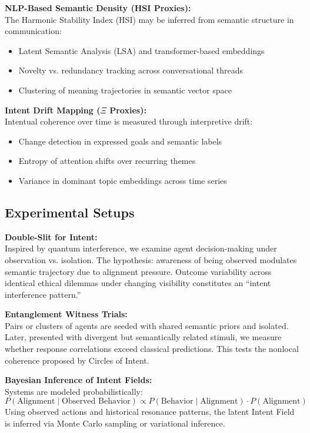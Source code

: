 \documentclass[12pt]{article}
\begin{document}
\textbf{NLP-Based Semantic Density (HSI Proxies):} \\
The Harmonic Stability Index (HSI) may be inferred from semantic structure in communication:
\begin{itemize}
  \item Latent Semantic Analysis (LSA) and transformer-based embeddings
  \item Novelty vs. redundancy tracking across conversational threads
  \item Clustering of meaning trajectories in semantic vector space
\end{itemize}

\textbf{Intent Drift Mapping (\(\Xi\) Proxies):} \\
Intentual coherence over time is measured through interpretive drift:
\begin{itemize}
  \item Change detection in expressed goals and semantic labels
  \item Entropy of attention shifts over recurring themes
  \item Variance in dominant topic embeddings across time series
\end{itemize}

\subsection{Experimental Setups}

\textbf{Double-Slit for Intent:} \\
Inspired by quantum interference, we examine agent decision-making under observation vs. isolation. The hypothesis: awareness of being observed modulates semantic trajectory due to alignment pressure. Outcome variability across identical ethical dilemmas under changing visibility constitutes an “intent interference pattern.”

\textbf{Entanglement Witness Trials:} \\
Pairs or clusters of agents are seeded with shared semantic priors and isolated. Later, presented with divergent but semantically related stimuli, we measure whether response correlations exceed classical predictions. This tests the nonlocal coherence proposed by Circles of Intent.

\textbf{Bayesian Inference of Intent Fields:} \\
Systems are modeled probabilistically:
\[
P(\text{Alignment} \mid \text{Observed Behavior}) \propto P(\text{Behavior} \mid \text{Alignment}) \cdot P(\text{Alignment})
\]
Using observed actions and historical resonance patterns, the latent Intent Field is inferred via Monte Carlo sampling or variational inference.
\end{document}
